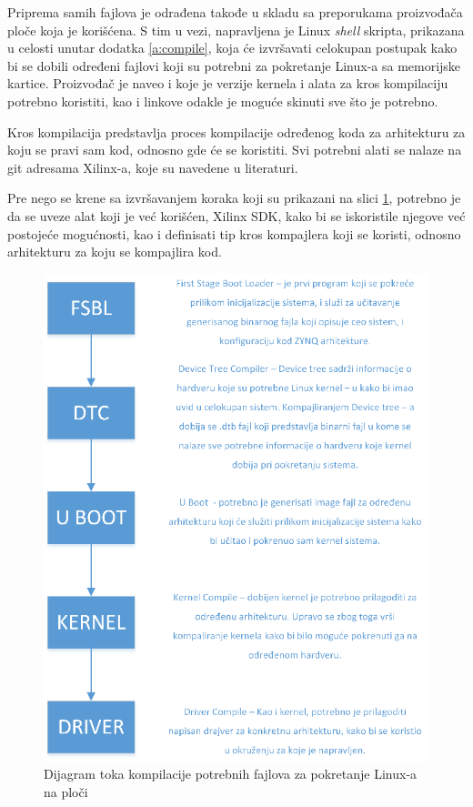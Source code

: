 \documentclass[a4paper, 12pt, diplomski]{etf}
\begin{document}
	Priprema samih fajlova je odrađena takođe u skladu sa preporukama proizvođača ploče koja je korišćena. S tim u vezi, napravljena je Linux \textit{shell} skripta, prikazana u celosti unutar dodatka \ref{a:compile}, koja će izvršavati celokupan postupak kako bi se dobili određeni fajlovi koji su potrebni za pokretanje Linux-a sa memorijske kartice. Proizvođač je naveo i koje je verzije kernela i alata za kros kompilaciju potrebno koristiti, kao i linkove odakle je moguće skinuti sve što je potrebno.

	\pagebreak

	Kros kompilacija predstavlja proces kompilacije određenog koda za arhitekturu za koju se pravi sam kod, odnosno gde će se koristiti. Svi potrebni alati se nalaze na git adresama Xilinx-a, koje su navedene u literaturi.

	Pre nego se krene sa izvršavanjem koraka koji su prikazani na slici \ref{fig:flow}, potrebno je da se uveze alat koji je već korišćen, Xilinx SDK, kako bi se iskoristile njegove već postojeće mogućnosti, kao i definisati tip kros kompajlera koji se koristi, odnosno arhitekturu za koju se kompajlira kod.

	\begin{figure}[htb]
		\centering
		\includegraphics[width=.8\textwidth]{images/flowCompile.png}
		\caption{Dijagram toka kompilacije potrebnih fajlova za pokretanje Linux-a na ploči}
		\label{fig:flow}
	\end{figure}
\end{document}
